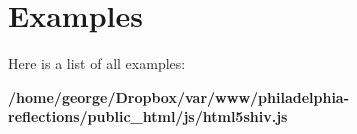\section{Examples}
Here is a list of all examples\+:\begin{DoxyCompactItemize}
\item 
{\bf /home/george/\+Dropbox/var/www/philadelphia-\/reflections/public\+\_\+html/js/html5shiv.\+js}
\end{DoxyCompactItemize}
